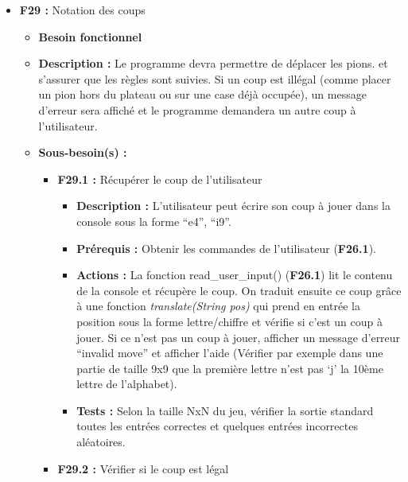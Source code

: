 \documentclass{article}
\begin{document}
\begin{itemize}
\begin{itemize}
        \item \textbf{Tests :} Le module bitarray peut être testé avec bitarray.test(). Les tests des algorithmes spécifiques sont renseignés dans les besoins \textbf{F29} (coups légaux et jouer un coup),  \textbf{F37} (détecter la fin de partie), \textbf{F36.1} (Recommencer une partie), etc.
    \end{itemize}
\bigskip
    \item \textbf{F29 :} Notation des coups
    \begin{itemize}
        \item \textbf{Besoin fonctionnel}
        \item \textbf{Description :} Le programme devra permettre de déplacer les pions. et s’assurer que les règles sont suivies. Si un coup est illégal (comme placer un pion hors du plateau ou sur une case déjà occupée), un message d’erreur sera affiché et le programme demandera un autre coup à l’utilisateur. 
        \item \textbf{Sous-besoin(s) :}
        \begin{itemize}
            \smallskip
            \item \textbf{F29.1 :} Récupérer le coup de l’utilisateur
            \begin{itemize}
                \item \textbf{Description :} L’utilisateur peut écrire son coup à jouer dans la console sous la forme “e4”, “i9”.
                \item \textbf{Prérequis :} Obtenir les commandes de l'utilisateur (\textbf{F26.1}).
                \item \textbf{Actions :} La fonction read\_user\_input() (\textbf{F26.1}) lit le contenu de la console et récupère le coup. On traduit ensuite ce coup grâce à une fonction \textit{translate(String pos)} qui prend en entrée la position sous la forme lettre/chiffre et vérifie si c’est un coup à jouer. Si ce n’est pas un coup à jouer, afficher un message d'erreur “invalid move” et afficher l’aide (Vérifier par exemple dans une partie de taille 9x9 que la première lettre n’est pas ‘j’ la 10ème lettre de l’alphabet).
                \item \textbf{Tests :} Selon la taille NxN du jeu, vérifier la sortie standard toutes les entrées correctes et quelques entrées incorrectes aléatoires.  
            \end{itemize}
            \smallskip
            \item \textbf{F29.2 :} Vérifier si le coup est légal

\end{itemize}
\end{itemize}
\end{itemize}
\end{document}
